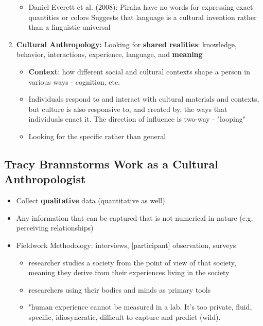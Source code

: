\documentclass{article}
\begin{document}
\begin{enumerate}
\begin{itemize}
            \item Daniel Everett et al. (2008): 
                \subitem Piraha have no words for expressing exact quantities or colors
                \subitem Suggests that language is a cultural invention rather than a linguistic universal
        \end{itemize}
    \item \textbf{Cultural Anthropology:} Looking for \textbf{shared realities}: knowledge, behavior, interactions, experience, language, and \textbf{meaning}
        \begin{itemize}
            \item \textbf{Context}: how different social and cultural contexts shape a person in various ways - cognition, etc. 
            \item Individuals respond to and interact with cultural materials and contexts, but culture is also responsive to, and created by, the ways that individuals enact it. The direction of influence is two-way - "looping" 
            \item Looking for the specific rather than general
        \end{itemize}
\end{enumerate}

\subsection{Tracy Brannstorms Work as a Cultural Anthropologist}
\begin{itemize}
    \item Collect \textbf{qualitative} data (quantitative as well) 
    \item Any information that can be captured that is not numerical in nature (e.g. perceiving relationships) 
    \item Fieldwork Methodology: interviews, [participant] observation, surveys
        \begin{itemize}
            \item researcher studies a society from the point of view of that society, meaning they derive from their experiences living in the society 
            \item researchers using their bodies and minds as primary tools
            \item "human experience cannot be measured in a lab. It's too private, fluid, specific, idiosyncratic, difficult to capture and predict (wild). 
        \end{itemize}
\end{itemize}
\end{document}
